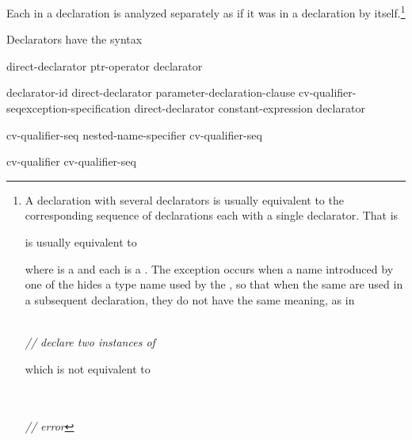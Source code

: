 \pnum
Each
in a declaration is analyzed separately as if it was in a declaration by
itself.\footnote{A declaration with several declarators is usually equivalent
to the corresponding sequence of declarations each with a single declarator.
That is


\noindent is usually equivalent to


\noindent where
is a
and each
is a
.
The exception occurs when a name introduced by one of the
hides a type name used by the
,
so that when the same
are used in a subsequent declaration, they do not have the same meaning,
as in

\\
\indent{} \textit{// declare two instances of} 

\noindent which is not equivalent to

\\
\indent{}\\
\indent{} \textit{// error}
}

\pnum
Declarators have the syntax

\begin{bnf}
\br
    direct-declarator\br
    ptr-operator declarator
\end{bnf}

\begin{bnf}
\br
    declarator-id\br
    direct-declarator \terminal{(} parameter-declaration-clause \terminal{)}
	cv-qualifier-seq\opt exception-specification\opt\br
    direct-declarator \terminal{[} constant-expression\opt \terminal{]}\br
    \terminal{(} declarator \terminal{)}
\end{bnf}

\begin{bnf}
\br
    \terminal{*} cv-qualifier-seq\opt\br
    \terminal{\&} \br
    \terminal{::}\opt nested-name-specifier \terminal{*} cv-qualifier-seq\opt
\end{bnf}

\begin{bnf}
\br
    cv-qualifier cv-qualifier-seq\opt
\end{bnf}

